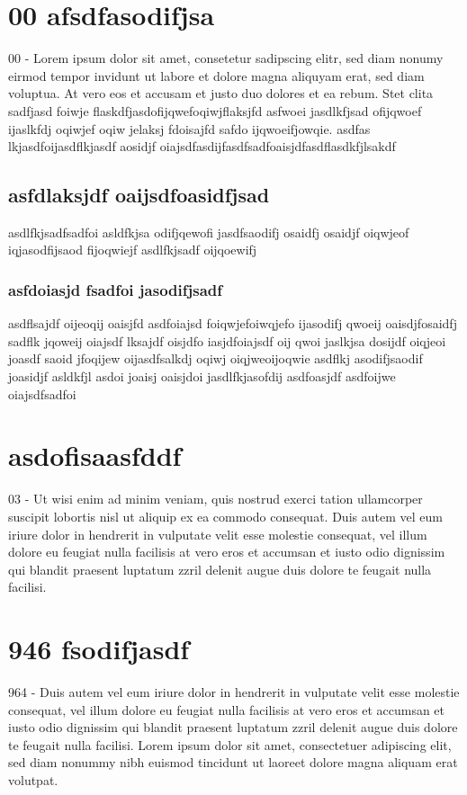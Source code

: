 \documentclass[11pt]{article}
\author{Admin}
\date{\today}
\title{}
\begin{document}
\tableofcontents

\section{00 afsdfasodifjsa}
\label{sec:org22a4f5d}
00 - Lorem ipsum dolor sit amet, consetetur sadipscing elitr, sed diam nonumy eirmod tempor invidunt ut labore et dolore magna aliquyam erat, sed diam voluptua. At vero eos et accusam et justo duo dolores et ea rebum. Stet clita sadfjasd foiwje flaskdfjasdofijqwefoqiwjflaksjfd asfwoei jasdlkfjsad ofijqwoef ijaslkfdj oqiwjef oqiw jelaksj fdoisajfd safdo ijqwoeifjowqie. asdfas lkjasdfoijasdflkjasdf aosidjf oiajsdfasdijfasdfsadfoaisjdfasdflasdkfjlsakdf
\subsection{asfdlaksjdf oaijsdfoasidfjsad}
\label{sec:org46f906b}
asdlfkjsadfsadfoi asldfkjsa odifjqewofi jasdfsaodifj osaidfj osaidjf oiqwjeof iqjasodfijsaod fijoqwiejf asdlfkjsadf oijqoewifj 
\subsubsection{asfdoiasjd fsadfoi jasodifjsadf}
\label{sec:org5bde6a9}
asdflsajdf oijeoqij oaisjfd asdfoiajsd foiqwjefoiwqjefo ijasodifj qwoeij oaisdjfosaidfj sadflk jqoweij oiajsdf lksajdf oisjdfo iasjdfoiajsdf oij qwoi jaslkjsa dosijdf oiqjeoi joasdf saoid jfoqijew oijasdfsalkdj oqiwj oiqjweoijoqwie asdflkj asodifjsaodif joasidjf asldkfjl asdoi joaisj oaisjdoi jasdlfkjasofdij
asdfoasjdf asdfoijwe oiajsdfsadfoi
\section{asdofisaasfddf}
\label{sec:orgd2b2288}
03 - Ut wisi enim ad minim veniam, quis nostrud exerci tation ullamcorper
suscipit lobortis nisl ut aliquip ex ea commodo consequat. Duis autem
vel eum iriure dolor in hendrerit in vulputate velit esse molestie
consequat, vel illum dolore eu feugiat nulla facilisis at vero eros et
accumsan et iusto odio dignissim qui blandit praesent luptatum zzril
delenit augue duis dolore te feugait nulla facilisi.
\section{946 fsodifjasdf}
\label{sec:orgcdccc7b}
964 - Duis autem vel eum iriure dolor in hendrerit in vulputate velit esse molestie consequat, vel illum dolore eu feugiat nulla facilisis at vero eros et accumsan et iusto odio dignissim qui blandit praesent luptatum  zzril delenit augue duis dolore te feugait nulla facilisi. Lorem ipsum dolor sit amet, consectetuer adipiscing elit, sed diam nonummy nibh euismod tincidunt ut laoreet dolore magna aliquam erat volutpat.  
\end{document}
